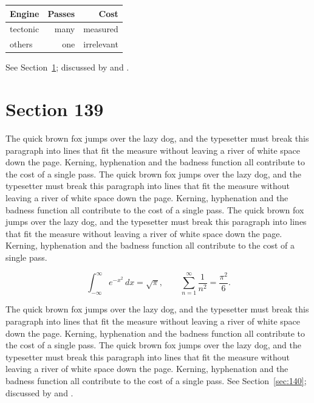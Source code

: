 \documentclass{article}
\begin{document}
\begin{center}
\begin{tabular}{lrr}
\toprule
Engine & Passes & Cost \\
\midrule
tectonic & many & measured \\
others & one & irrelevant \\
\bottomrule
\end{tabular}
\end{center}

See Section~\ref{sec:139}; discussed by \textcite{k4} and \textcite{l1}.
\section{Section 139}
\label{sec:139}
The quick brown fox jumps over the lazy dog, and the typesetter must break this paragraph into lines that fit the measure without leaving a river of white space down the page. Kerning, hyphenation and the badness function all contribute to the cost of a single pass. The quick brown fox jumps over the lazy dog, and the typesetter must break this paragraph into lines that fit the measure without leaving a river of white space down the page. Kerning, hyphenation and the badness function all contribute to the cost of a single pass. The quick brown fox jumps over the lazy dog, and the typesetter must break this paragraph into lines that fit the measure without leaving a river of white space down the page. Kerning, hyphenation and the badness function all contribute to the cost of a single pass. 

\begin{equation}\label{eq:139}
\int_{-\infty}^{\infty} e^{-x^{2}}\,dx = \sqrt{\pi}, \qquad
\sum_{n=1}^{\infty} \frac{1}{n^{2}} = \frac{\pi^{2}}{6}.
\end{equation}

The quick brown fox jumps over the lazy dog, and the typesetter must break this paragraph into lines that fit the measure without leaving a river of white space down the page. Kerning, hyphenation and the badness function all contribute to the cost of a single pass. The quick brown fox jumps over the lazy dog, and the typesetter must break this paragraph into lines that fit the measure without leaving a river of white space down the page. Kerning, hyphenation and the badness function all contribute to the cost of a single pass. 
See Section~\ref{sec:140}; discussed by \textcite{k5} and \textcite{l2}.
\end{document}

